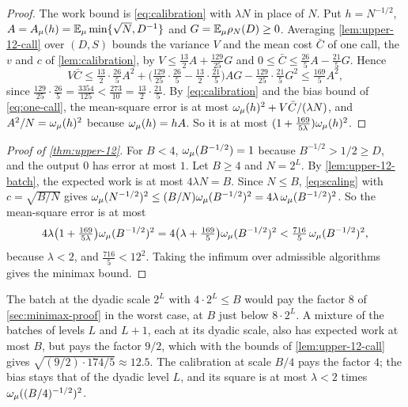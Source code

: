 
\begin{proof}
The work bound is \eqref{eq:calibration} with $\lambda N$ in place of $N$.
Put $h=N^{-1/2}$, $A=A_\mu(h)=\mathbb E_\mu\min\{\sqrt N,D^{-1}\}$ and
$G=\mathbb E_\mu\rho_N(D)\ge0$. Averaging \cref{lem:upper-12-call} over $(D,S)$
bounds the variance $V$ and the mean cost $\bar C$ of one call, the $v$ and
$c$ of \cref{lem:calibration}, by
$V\le\tfrac{13}{2}A+\tfrac{129}{25}G$ and
$0\le\bar C\le\tfrac{26}{5}A-\tfrac{21}{5}G$. Hence
\[
 V\bar C\le\tfrac{13}{2}\cdot\tfrac{26}{5}A^2
  +\bigl(\tfrac{129}{25}\cdot\tfrac{26}{5}-\tfrac{13}{2}\cdot\tfrac{21}{5}\bigr)AG
  -\tfrac{129}{25}\cdot\tfrac{21}{5}G^2
 \le\tfrac{169}{5}A^2,
\]
since $\tfrac{129}{25}\cdot\tfrac{26}{5}=\tfrac{3354}{125}<\tfrac{273}{10}
=\tfrac{13}{2}\cdot\tfrac{21}{5}$. By \eqref{eq:calibration} and the bias
bound of \eqref{eq:one-call}, the mean-square error is at most
$\omega_\mu(h)^2+V\bar C/(\lambda N)$, and $A^2/N=\omega_\mu(h)^2$ because $\omega_\mu(h)=hA$.
So it is at most $(1+\tfrac{169}{5\lambda})\omega_\mu(h)^2$.
\end{proof}

\begin{proof}[Proof of \cref{thm:upper-12}]
For $B<4$, $\omega_\mu(B^{-1/2})=1$ because $B^{-1/2}>1/2\ge D$, and the
output $0$ has error at most $1$. Let $B\ge4$ and $N=2^L$. By
\cref{lem:upper-12-batch}, the expected work is at most $4\lambda N=B$.
Since $N\le B$, \eqref{eq:scaling} with $c=\sqrt{B/N}$ gives
$\omega_\mu(N^{-1/2})^2\le(B/N)\omega_\mu(B^{-1/2})^2=4\lambda\,\omega_\mu(B^{-1/2})^2$. So the
mean-square error is at most
\[
 4\lambda\bigl(1+\tfrac{169}{5\lambda}\bigr)\omega_\mu(B^{-1/2})^2
 =4\bigl(\lambda+\tfrac{169}{5}\bigr)\omega_\mu(B^{-1/2})^2
 <\tfrac{716}{5}\,\omega_\mu(B^{-1/2})^2,
\]
because $\lambda<2$, and $\tfrac{716}{5}<12^2$. Taking the infimum over
admissible algorithms gives the minimax bound.
\end{proof}

The batch at the dyadic scale $2^L$ with $4\cdot2^L\le B$ would pay the
factor $8$ of \cref{sec:minimax-proof} in the worst case, at $B$ just
below $8\cdot2^L$. A mixture of the batches of levels $L$ and $L+1$, each
at its dyadic scale, also has expected work at most $B$, but pays the factor
$9/2$, which with the bounds of \cref{lem:upper-12-call} gives
$\sqrt{(9/2)\cdot174/5}\approx12.5$. The calibration at scale $B/4$ pays
the factor $4$; the bias stays that of the dyadic level $L$, and its square
is at most $\lambda<2$ times $\omega_\mu((B/4)^{-1/2})^2$.

